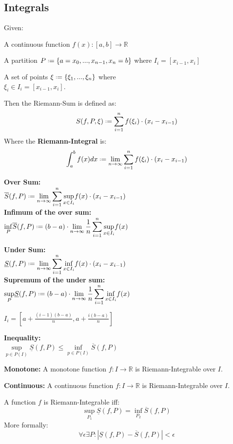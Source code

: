 \documentclass[8pt,a4paper]{extarticle}     %
\theoremstyle{definition}
\theoremstyle{definition}
\theoremstyle{definition}
\newcommand{\R}{\mathbb{R}}
\newcommand*{\defeq}{\mathrel{\vcenter{\baselineskip0.5ex \lineskiplimit0pt
            \hbox{\scriptsize.}\hbox{\scriptsize.}}}%
            =}
\begin{document}
\begin{multicols}{4}
\section{Integrals}
\begin{boxdefinition}
	Given:
	\begin{bulletlist}
		\item A continuous function $f(x): [a,b] \longrightarrow \R$
		\item A partition $P \defeq \{a=x_0,...,x_{n-1}, x_n=b\} $ where $I_i = [x_{i-1}, x_i]$
		\item A set of points $\xi \defeq \{\xi_1,...,\xi_n\}$ where \\$\xi_i\in I_i = [x_{i-1}, x_i]$.
	\end{bulletlist}
	Then the Riemann-Sum is defined as: 
	$$S(f, P, \xi) \defeq \sum_{i=1}^n f(\xi_i) \cdot (x_i-x_{i-1})$$
	Where the \textbf{Riemann-Integral} is: 
	$$\int_{a}^{b} f(x)dx \defeq \lim_{n\to\infty}\sum_{i=1}^n f(\xi_i) \cdot (x_i-x_{i-1})$$
\end{boxdefinition}
\begin{eqlist}
	\item \textbf{Over Sum:} \\
	$\displaystyle\overline{S}(f, P) \defeq \lim_{n\to\infty}\sum_{i=1}^n \underset{x\in I_i}{\sup}f(x) \cdot (x_i-x_{i-1})$\\
	\textbf{Infimum of the over sum:} \\
	$\displaystyle\underset{P}{\inf}\overline{S}(f, P) \defeq (b-a)\cdot\lim_{n\to\infty} \frac{1}{n} \sum_{i=1}^n \underset{x\in I_i}{\sup}f(x)$
	\item \textbf{Under Sum:} \\
	$\displaystyle\underline{S}(f, P) \defeq \lim_{n\to\infty}\sum_{i=1}^n \underset{x\in I_i}{\inf}f(x) \cdot (x_i-x_{i-1})$\\
	\textbf{Supremum of the under sum:} \\
	$\displaystyle\underset{P}{\sup}\underline{S}(f, P) \defeq (b-a)\cdot\lim_{n\to\infty} \frac{1}{n} \sum_{i=1}^n \underset{x\in I_i}{\inf}f(x)$
	\item[] $\displaystyle I_i = \left[a+\frac{(i-1)(b-a)}{n}, a+\frac{i(b-a)}{n}\right]$
	\item \textbf{Inequality:} \\
	$\underset{p\in P(I)}{\sup}\underline{S}(f, P) \leq \underset{p\in P(I)}{\inf}\overline{S}(f, P)$
	\item \textbf{Monotone:} A monotone function $f:I \rightarrow \R$ is Riemann-Integrable over $I$.
	\item \textbf{Continuous:} A continuous function $f:I \rightarrow \R$ is Riemann-Integrable over $I$.
\end{eqlist}
\begin{boxtheorem} 
	A function $f$ is Riemann-Integrable iff: 
	$$\underset{P_1}{\sup}\underline{S}(f, P) = \underset{P_2}{\inf}\overline{S}(f, P)$$
	More formally: 
	$$\forall \epsilon \exists P: |\underline{S}(f, P) - \overline{S}(f, P)| < \epsilon$$


\end{boxtheorem}
\end{multicols}
\end{document}
